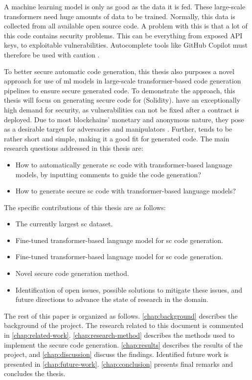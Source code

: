 A machine learning model is only as good as the data it is fed. These large-scale transformers need huge amounts of data to be trained. Normally, this data is collected from all available open source code. A problem with this is that a lot of this code contains security problems. This can be everything from exposed API keys, to exploitable vulnerabilities. Autocomplete tools like GitHub Copilot must therefore be used with caution \cite{chen2021codex}.

To better secure automatic code generation, this thesis also purposes a novel approach for use of \acrshort{ml} models in large-scale transformer-based code generation pipelines to ensure secure generated code. To demonstrate the approach, this thesis will focus on generating secure code for  (Solidity).  have an exceptionally high demand for security, as vulnerabilities can not be fixed after a contract is deployed. Due to most blockchains' monetary and anonymous nature, they pose as a desirable target for adversaries and manipulators \cite{atzei2017survey}. Further,  tends to be rather short and simple, making it a good fit for generated code. The main research questions addressed in this thesis are:
\begin{itemize}
    \item How to automatically generate \acrlong{sc} code with transformer-based language models, by inputting comments to guide the code generation?
    \item How to generate secure \acrlong{sc} code with transformer-based language models?
\end{itemize}

\noindent
The specific contributions of this thesis are as follows:
\begin{itemize}
    \item The currently largest \acrfull{sc} dataset.
    \item Fine-tuned transformer-based language model for \acrlong{sc} code generation.
    \item Fine-tuned transformer-based language model for \acrlong{sc} code generation.
    \item Novel secure code generation method.
    \item Identification of open issues, possible solutions to mitigate these issues, and future directions to advance the state of research in the domain.
\end{itemize}

The rest of this paper is organized as follows. \cref{chap:background} describes the background of the project. The research related to this document is commented in \cref{chap:related-work}. \cref{chap:research-method} describes the methods used to implement the secure code generation. \cref{chap:results} describes the results of the project, and \cref{chap:discussion} discuss the findings. Identified future work is presented in \cref{chap:future-work}. \cref{chap:conclusion} presents final remarks and concludes the thesis.
